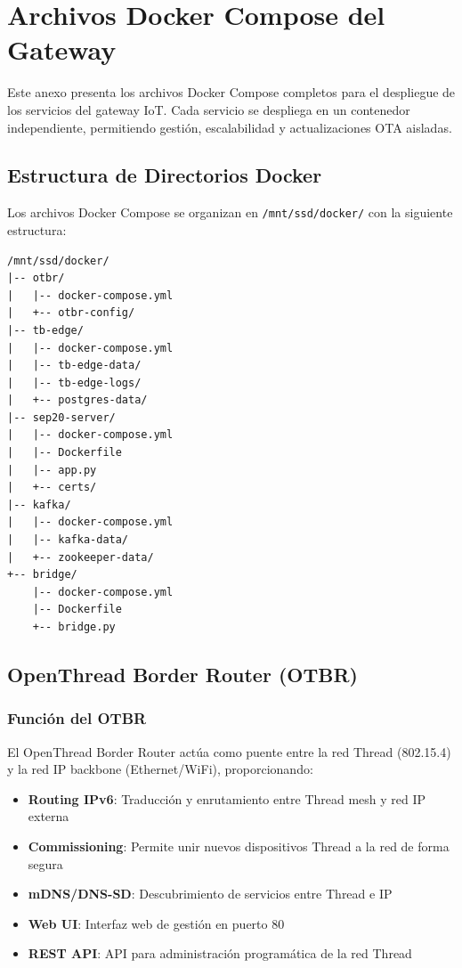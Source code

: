 ﻿\chapter{Archivos Docker Compose del Gateway}
\label{anexo:docker-compose}

Este anexo presenta los archivos Docker Compose completos para el despliegue de los servicios del gateway IoT. Cada servicio se despliega en un contenedor independiente, permitiendo gestión, escalabilidad y actualizaciones OTA aisladas.

\section{Estructura de Directorios Docker}

Los archivos Docker Compose se organizan en \texttt{/mnt/ssd/docker/} con la siguiente estructura:

\begin{verbatim}
/mnt/ssd/docker/
|-- otbr/
|   |-- docker-compose.yml
|   +-- otbr-config/
|-- tb-edge/
|   |-- docker-compose.yml
|   |-- tb-edge-data/
|   |-- tb-edge-logs/
|   +-- postgres-data/
|-- sep20-server/
|   |-- docker-compose.yml
|   |-- Dockerfile
|   |-- app.py
|   +-- certs/
|-- kafka/
|   |-- docker-compose.yml
|   |-- kafka-data/
|   +-- zookeeper-data/
+-- bridge/
    |-- docker-compose.yml
    |-- Dockerfile
    +-- bridge.py
\end{verbatim}

\section{OpenThread Border Router (OTBR)}

\subsection{Función del OTBR}

El OpenThread Border Router actúa como puente entre la red Thread (802.15.4) y la red IP backbone (Ethernet/WiFi), proporcionando:

\begin{itemize}
    \item \textbf{Routing IPv6}: Traducción y enrutamiento entre Thread mesh y red IP externa
    \item \textbf{Commissioning}: Permite unir nuevos dispositivos Thread a la red de forma segura
    \item \textbf{mDNS/DNS-SD}: Descubrimiento de servicios entre Thread e IP
    \item \textbf{Web UI}: Interfaz web de gestión en puerto 80
    \item \textbf{REST API}: API para administración programática de la red Thread
\end{itemize}

